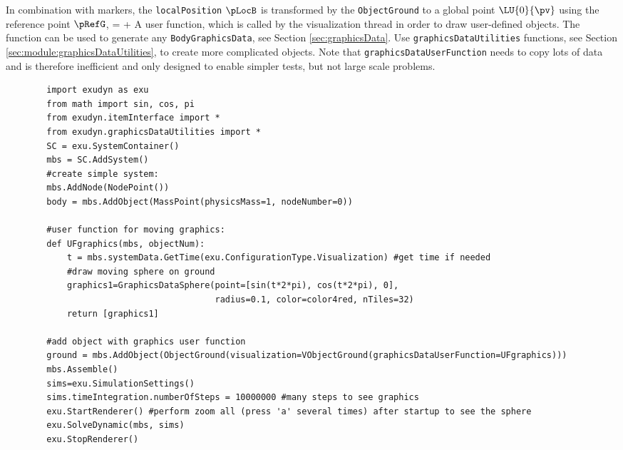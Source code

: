     In combination with markers, the \texttt{localPosition} $\pLocB$ is transformed by the \texttt{ObjectGround} to
    a global point $\LU{0}{\pv}$ using the reference point $\pRefG$,
    \be
       = \pRefG +  \pLocB \eqDot
    \ee
    A user function, which is called by the visualization thread in order to draw user-defined objects.
    The function can be used to generate any \texttt{BodyGraphicsData}, see Section \ref{sec:graphicsData}.
    Use \texttt{graphicsDataUtilities} functions, see Section \ref{sec:module:graphicsDataUtilities}, to create more complicated objects. 
    Note that \texttt{graphicsDataUserFunction} needs to copy lots of data and is therefore
    inefficient and only designed to enable simpler tests, but not large scale problems.
    \finishTable
    \userFunctionExample{}
    \pythonstyle\begin{lstlisting}
        import exudyn as exu
        from math import sin, cos, pi
        from exudyn.itemInterface import *
        from exudyn.graphicsDataUtilities import *
        SC = exu.SystemContainer()
        mbs = SC.AddSystem()
        #create simple system:
        mbs.AddNode(NodePoint())
        body = mbs.AddObject(MassPoint(physicsMass=1, nodeNumber=0))
        
        #user function for moving graphics:
        def UFgraphics(mbs, objectNum):
            t = mbs.systemData.GetTime(exu.ConfigurationType.Visualization) #get time if needed
            #draw moving sphere on ground
            graphics1=GraphicsDataSphere(point=[sin(t*2*pi), cos(t*2*pi), 0], 
                                         radius=0.1, color=color4red, nTiles=32)
            return [graphics1] 

        #add object with graphics user function
        ground = mbs.AddObject(ObjectGround(visualization=VObjectGround(graphicsDataUserFunction=UFgraphics)))
        mbs.Assemble()
        sims=exu.SimulationSettings()
        sims.timeIntegration.numberOfSteps = 10000000 #many steps to see graphics
        exu.StartRenderer() #perform zoom all (press 'a' several times) after startup to see the sphere
        exu.SolveDynamic(mbs, sims)
        exu.StopRenderer()
    \end{lstlisting}
